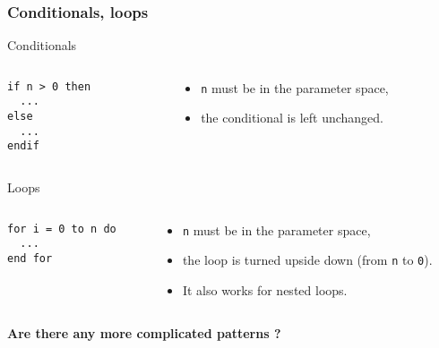 \documentclass[10pt]{beamer}
\begin{document}
\begin{frame}[fragile]
  \frametitle{Conditionals, loops}
  
  \begin{block}{Conditionals}
    \begin{columns}
      \begin{column}{0.3\textwidth}
        \begin{center}
          \begin{minipage}{0.7\textwidth}
            \footnotesize
\begin{verbatim}
if n > 0 then
  ...
else
  ...
endif
\end{verbatim}    
          \end{minipage}
        \end{center}
      \end{column}
      \begin{column}{0.7\textwidth}
        \begin{itemize}
          \item \verb|n| \alert{must be} in the parameter space,
          \item the conditional is left unchanged.
        \end{itemize}
      \end{column}
    \end{columns}
  \end{block}

  \begin{block}{Loops}
    \begin{columns}
      \begin{column}{0.3\textwidth}
        \begin{center}
          \begin{minipage}{0.7\textwidth}
            \footnotesize
\begin{verbatim}
for i = 0 to n do
  ...
end for
\end{verbatim}    
          \end{minipage}
        \end{center}
      \end{column}
      \begin{column}{0.7\textwidth}
        \begin{itemize}
          \item \verb|n| \alert{must be} in the parameter space,
          \item the loop is turned upside down (from \verb|n| to \verb|0|).
          \item It also works for nested loops.
        \end{itemize}
      \end{column}
    \end{columns}    
  \end{block}

  \begin{center}
    \textbf{Are there any more complicated patterns ?}
  \end{center}
\end{frame}
\end{document}
